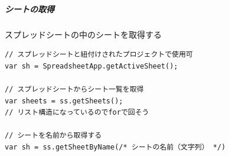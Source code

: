 \documentclass[dvipdfmx,jb5]{jarticle}
\begin{document}
\subparagraph{シートの取得}
スプレッドシートの中のシートを取得する
\begin{lstlisting}
// スプレッドシートと紐付けされたプロジェクトで使用可
var sh = SpreadsheetApp.getActiveSheet();

// スプレッドシートからシート一覧を取得
var sheets = ss.getSheets();
// リスト構造になっているのでforで回そう

// シートを名前から取得する
var sh = ss.getSheetByName(/* シートの名前（文字列） */)
\end{lstlisting}
\end{document}
